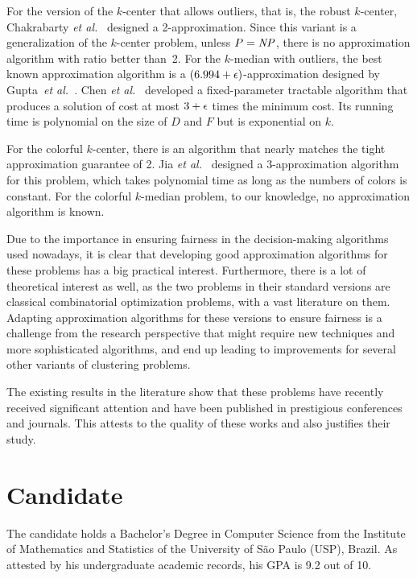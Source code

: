 \documentclass[12pt]{article}
\begin{document}
For the version of the $k$-center that allows outliers, that is, the robust $k$-center, 
Chakrabarty \emph{et al.}~\cite{CGK2020} designed a 2-approximation. 
Since this variant is a generalization of the $k$-center problem, unless $P = \mathit{NP}$, there is no approximation algorithm with ratio better than~2.
For the $k$-median with outliers, the best known approximation algorithm is a $(6.994 + \epsilon)$-approximation designed by Gupta~\emph{et al.}~\cite{GMZ2021}.
Chen \emph{et al.}~\cite{CHXXZ2024} developed a fixed-parameter tractable algorithm that produces a solution of cost at most $3 + \epsilon$ times the minimum cost. Its running time is polynomial on the size of $D$ and $F$ but is exponential on $k$.

For the colorful $k$-center, there is an algorithm that nearly matches the tight approximation guarantee of 2. Jia \emph{et al.}~\cite{JSS2020} designed a 3-approximation algorithm for this problem, which takes polynomial time as long as the numbers of colors is constant. For the colorful $k$-median problem, to our knowledge, no approximation algorithm is known.

Due to the importance in ensuring fairness in the decision-making algorithms used nowadays, it is clear that developing good approximation algorithms for these problems has a big practical interest. 
Furthermore, there is a lot of theoretical interest as well, as the two problems in their standard versions are classical combinatorial optimization problems, with a vast literature on them. Adapting approximation algorithms for these versions to ensure fairness is a challenge from the research perspective that might require new techniques and more sophisticated algorithms, and end up leading to improvements for several other variants of clustering problems. 

The existing results in the literature show that these problems have recently received significant attention and have been published in prestigious conferences and journals. This attests to the quality of these works and also justifies their study.

\section{Candidate}

The candidate holds a Bachelor's Degree in Computer Science from the Institute of Mathematics and Statistics of the University of São Paulo (USP), Brazil.  As attested by his undergraduate academic records, his GPA is 9.2 out of 10.  
\end{document}
